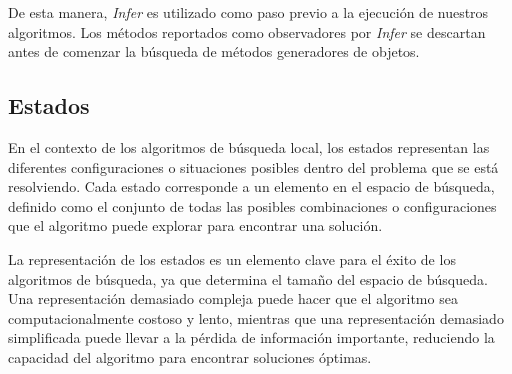 


De esta manera, \emph{Infer} es utilizado como paso previo a la ejecución de nuestros algoritmos. Los métodos reportados como observadores por \emph{Infer} se descartan antes de comenzar la búsqueda de métodos generadores de objetos.


\subsection{Estados}
\label{sec:estados}
En el contexto de los algoritmos de búsqueda local, los estados representan las diferentes configuraciones o situaciones posibles dentro del problema que se está resolviendo. Cada estado corresponde a un elemento en el espacio de búsqueda, definido como el conjunto de todas las posibles combinaciones o configuraciones que el algoritmo puede explorar para encontrar una solución.

La representación de los estados es un elemento clave para el éxito de los algoritmos de búsqueda, ya que determina el tamaño del espacio de búsqueda. 
Una representación demasiado compleja puede hacer que el algoritmo sea computacionalmente costoso y lento, mientras que una representación demasiado simplificada puede llevar a la pérdida de información importante, reduciendo la capacidad del algoritmo para encontrar soluciones óptimas.

